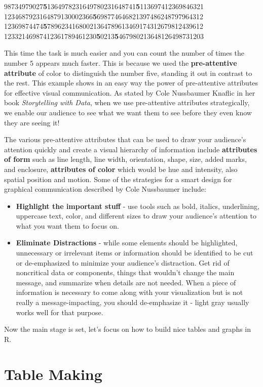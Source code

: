 \documentclass[
]{krantz}
\providecommand{\tightlist}{%
  \setlength{\itemsep}{0pt}\setlength{\parskip}{0pt}}
\begin{document}
98734979027{\textbf{5}}1364978231649780231648741{\textbf{5}}113697412369846321
1234687923164879130002366{\textbf{5}}698774646821397486248797964312
12369874474{\textbf{5}}78962341680021364789613469174312679812439612
12332146987412361789461230{\textbf{5}}0213{\textbf{5}}467980213648126498731203

This time the task is much easier and you can count the number of times the number 5 appears much faster. This is because we used the \textbf{pre-attentive attribute} of color to distinguish the number five, standing it out in contrast to the rest. This example shows in an easy way the power of pre-attentive attributes for effective visual communication. As stated by Cole Nussbaumer Knaflic in her book \emph{Storytelling with Data}, when we use pre-attentive attributes strategically, we enable our audience to see what we want them to see before they even know they are seeing it!

The various pre-attentive attributes that can be used to draw your audience's attention quickly and create a visual hierarchy of information include \textbf{attributes of form} such as line length, line width, orientation, shape, size, added marks, and enclosure, \textbf{attributes of color} which would be hue and intensity, also spatial position and motion. Some of the strategies for a smart design for graphical communication described by Cole Nussbaumer include:

\begin{itemize}
\tightlist
\item
  \textbf{Highlight the important stuff} - use tools such as bold, italics, underlining, uppercase text, color, and different sizes to draw your audience's attention to what you want them to focus on.
\item
  \textbf{Eliminate Distractions} - while some elements should be highlighted, unnecessary or irrelevant items or information should be identified to be cut or de-emphasized to minimize your audience's distraction. Get rid of noncritical data or components, things that wouldn't change the main message, and summarize when details are not needed. When a piece of information is necessary to come along with your visualization but is not really a message-impacting, you should de-emphasize it - light gray usually works well for that purpose.
\end{itemize}

Now the main stage is set, let's focus on how to build nice tables and graphs in R.

\hypertarget{tablemaking}{%
\section{Table Making}\label{tablemaking}}
\end{document}
